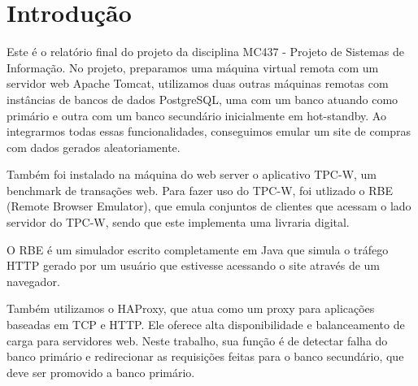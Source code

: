 \documentclass[11pt,twoside]{article}
\begin{document}
\begin{abstract}
\setlength{\parindent}{4ex}
Este é o relat\'orio final do projeto da disciplina de MC437 (Projeto de Sistemas de Informa\c{c}\~ao), que tem como objetivo resolver um problema de replicação de banco de dados. Foram utilizados dois bancos de dados diferentes, um atuando como primário e outro como secundário. O primário é replicado para um secundário em hot-standby. Ao inserirmos uma falha no neste, promovemos o secundário para primário e fazemos o antigo primário voltar como secundário, sendo que o objetivo é deixar o menor tempo de indisponibilidade possível no sistema.
Utilizamos o benchmark TPC-W, que modela uma livraria online, atrav\'es de um ambiente controlado, para simular atividades num servidor WEB. Em conjunto com o simulador RBE, que gera tr\^es diferentes perfis de carga (Shopping, Ordering e Browsing), pudemos checar o desempenho do servidor instalado num cluster no IC, ao vermos o n\'umero de WIPS (WEB Interactions per Second) e WIRT (WEB Interaction Response Time) gerados por diferentes cargas.
\end{abstract}

\section{Introdução}
Este \'e o relat\'orio final do projeto da disciplina MC437 - Projeto de Sistemas de Informação. No projeto, preparamos uma m\'aquina virtual remota com um servidor  web Apache Tomcat, utilizamos duas outras máquinas remotas com instâncias de bancos de dados PostgreSQL, uma com um banco atuando como primário e outra com um banco secundário inicialmente em hot-standby. Ao integrarmos todas essas funcionalidades, conseguimos emular um site de compras com dados gerados aleatoriamente.

    Também foi instalado na máquina do web server o aplicativo TPC-W, um benchmark de transa\c{c}\~oes web. Para fazer uso do TPC-W, foi utlizado o RBE (Remote Browser Emulator), que emula conjuntos de clientes que acessam o lado servidor do TPC-W, sendo que este implementa uma livraria digital.

    O RBE \'e um simulador escrito completamente em Java que simula o tr\'afego HTTP gerado por um usu\'ario que estivesse acessando o site atrav\'es de um navegador.

    Também utilizamos o HAProxy, que atua como um proxy para aplicações baseadas em TCP e HTTP. Ele oferece alta disponibilidade e balanceamento de carga para servidores web. Neste trabalho, sua função é de detectar falha do banco primário e redirecionar as requisições feitas para o banco secundário, que deve ser promovido a banco primário.
\end{document}
